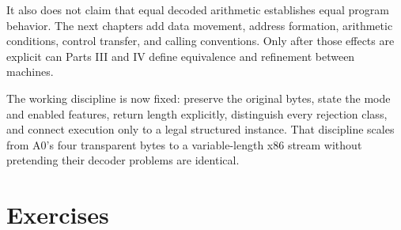 It also does not claim that equal decoded arithmetic establishes equal program
behavior. The next chapters add data movement, address formation, arithmetic
conditions, control transfer, and calling conventions. Only after those
effects are explicit can Parts III and IV define equivalence and refinement
between machines.

The working discipline is now fixed: preserve the original bytes, state the
mode and enabled features, return length explicitly, distinguish every
rejection class, and connect execution only to a legal structured instance.
That discipline scales from A0's four transparent bytes to a variable-length
x86 stream without pretending their decoder problems are identical.

\section{Exercises}

